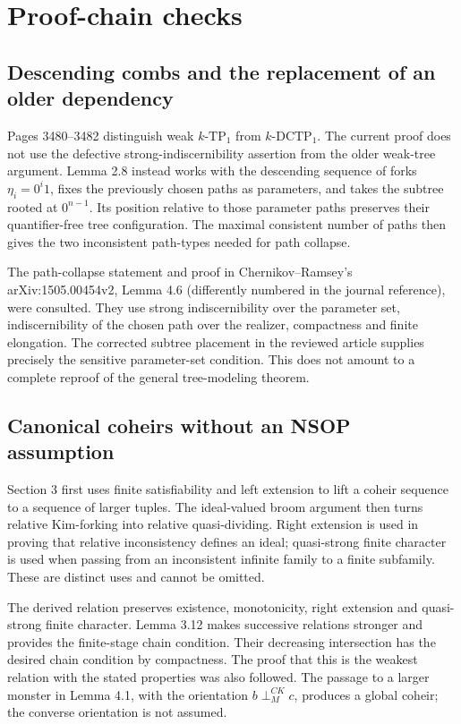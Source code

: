 \documentclass[10pt]{article}
\begin{document}
\section*{Proof-chain checks}
\subsection*{Descending combs and the replacement of an older dependency}
Pages 3480–3482 distinguish weak \(k\)-\(\mathrm{TP}_1\) from \(k\)-\(\mathrm{DCTP}_1\). The current proof does not use the defective strong-indiscernibility assertion from the older weak-tree argument. Lemma 2.8 instead works with the descending sequence of forks \(\eta_i=0^i1\), fixes the previously chosen paths as parameters, and takes the subtree rooted at \(0^{n-1}\). Its position relative to those parameter paths preserves their quantifier-free tree configuration. The maximal consistent number of paths then gives the two inconsistent path-types needed for path collapse.\par
The path-collapse statement and proof in Chernikov–Ramsey’s arXiv:1505.00454v2, Lemma 4.6 (differently numbered in the journal reference), were consulted. They use strong indiscernibility over the parameter set, indiscernibility of the chosen path over the realizer, compactness and finite elongation. The corrected subtree placement in the reviewed article supplies precisely the sensitive parameter-set condition. This does not amount to a complete reproof of the general tree-modeling theorem.\par
\subsection*{Canonical coheirs without an NSOP assumption}
Section 3 first uses finite satisfiability and left extension to lift a coheir sequence to a sequence of larger tuples. The ideal-valued broom argument then turns relative Kim-forking into relative quasi-dividing. Right extension is used in proving that relative inconsistency defines an ideal; quasi-strong finite character is used when passing from an inconsistent infinite family to a finite subfamily. These are distinct uses and cannot be omitted.\par
The derived relation preserves existence, monotonicity, right extension and quasi-strong finite character. Lemma 3.12 makes successive relations stronger and provides the finite-stage chain condition. Their decreasing intersection has the desired chain condition by compactness. The proof that this is the weakest relation with the stated properties was also followed. The passage to a larger monster in Lemma 4.1, with the orientation \(b\mathrel{\perp}^{CK}_M c\), produces a global coheir; the converse orientation is not assumed.\par
\end{document}
